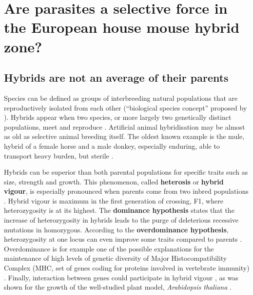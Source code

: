 \section{Are parasites a selective force in the European house mouse hybrid zone?}
\subsection{Hybrids are not an average of their parents}
Species can be defined as groups of interbreeding natural populations that are reproductively isolated from each other (“biological species concept” proposed by \cite{mayr_animal_1963}). Hybrids appear when two species, or more largely two genetically distinct populations, meet and reproduce \citep{barton_analysis_1985}. Artificial animal hybridisation may be almost as old as selective animal breeding itself. The oldest known example is the mule, hybrid of a female horse and a male donkey, especially enduring, able to transport heavy burden, but sterile \citep{leighton_mule_1967}. 
\par
Hybrids can be superior than both parental populations for specific traits such as size, strength and growth. This phenomenon, called \textbf{heterosis} or \textbf{hybrid vigour}, is especially pronounced when parents come from two inbred populations \citep{brenner_heterosis_2001}. Hybrid vigour is maximum in the first generation of crossing, F1, where heterozygosity is at its highest. The \textbf{dominance hypothesis} states that the increase of heterozygosity in hybrids leads to the purge of deleterious recessive mutations in homozygous. According to the \textbf{overdominance hypothesis}, heterozygosity at one locus can even improve some traits compared to parents \citep{crow_overdominance_2001}. Overdominance is for example one of the possible explanations for the maintenance of high levels of genetic diversity of Major Histocompatibility Complex (MHC, set of genes coding for proteins involved in vertebrate immunity) \citep{read_major_2001, sommer_importance_2005}. Finally, interaction between genes could participate in hybrid vigour \parencite[\textbf{positive epistasis};][]{schnell_multiplicative_1992}, as was shown for the growth of the well-studied plant model, \textit{Arabidopsis thaliana} \citep{vanhaeren_combining_2014}.
\par
